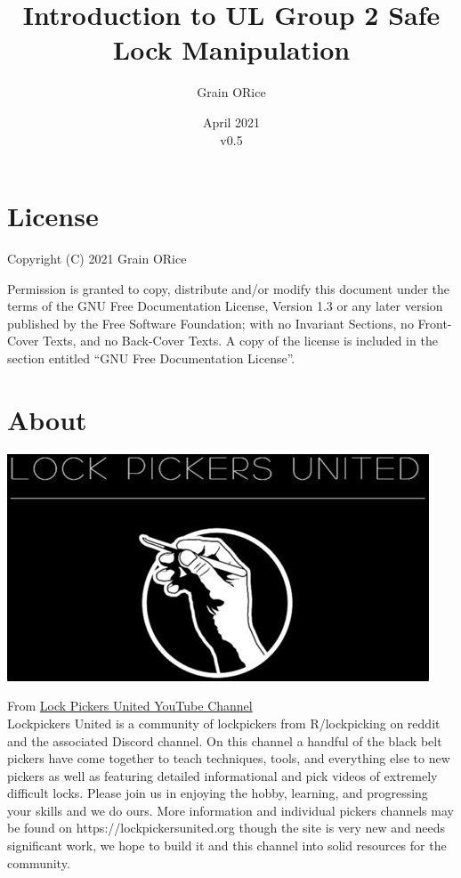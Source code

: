 \documentclass[11pt, letterpaper]{article}
\begin{document}
\title{Introduction to UL Group 2 Safe Lock Manipulation}
\author{Grain ORice}
\date{April 2021\\
  {\color{blue}v0.5}}
\maketitle

\section*{License}
Copyright (C)  2021  Grain ORice

\noindent Permission is granted to copy, distribute and/or modify this document
under the terms of the GNU Free Documentation License, Version 1.3
or any later version published by the Free Software Foundation;
with no Invariant Sections, no Front-Cover Texts, and no Back-Cover Texts.
A copy of the license is included in the section entitled
``GNU Free Documentation License''.

\section*{About}

\begin{center}
  \includegraphics[scale=.5]{lpu}
\end{center}

From \href{https://www.youtube.com/channel/UCHEPEHbo6kAxsxvIePE9kRw/about}{Lock
  Pickers United YouTube Channel} \\
Lockpickers United is a community of lockpickers from R/lockpicking on reddit
and the associated Discord channel. On this channel a handful of the black belt
pickers have come together to teach techniques, tools, and everything else to
new pickers as well as featuring detailed informational and pick videos of
extremely difficult locks. Please join us in enjoying the hobby, learning,
and progressing your skills and we do ours. More information and individual
pickers channels may be found on https://lockpickersunited.org though the site
is very new and needs significant work, we hope to build it and this channel
into solid resources for the community.
\newpage
\end{document}

